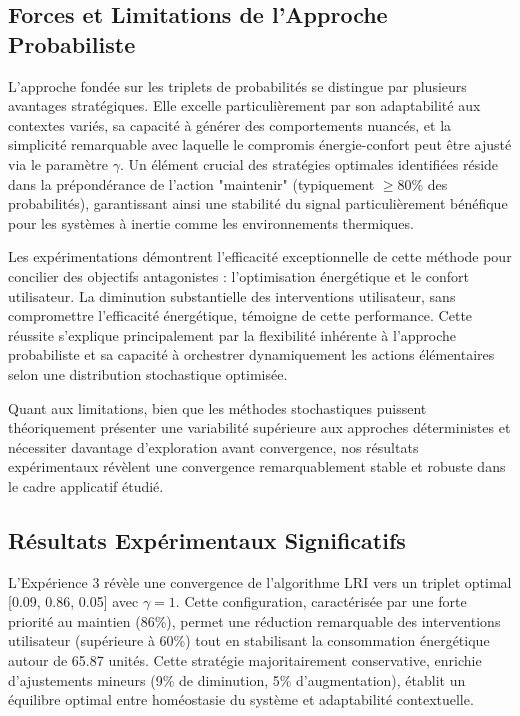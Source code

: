 \documentclass[a4paper,11pt]{article}
\begin{document}
\subsection{Forces et Limitations de l'Approche Probabiliste}

L'approche fondée sur les triplets de probabilités se distingue par plusieurs avantages stratégiques. Elle excelle particulièrement par son adaptabilité aux contextes variés, sa capacité à générer des comportements nuancés, et la simplicité remarquable avec laquelle le compromis énergie-confort peut être ajusté via le paramètre $\gamma$. Un élément crucial des stratégies optimales identifiées réside dans la prépondérance de l'action "maintenir" (typiquement $\geq$80\% des probabilités), garantissant ainsi une stabilité du signal particulièrement bénéfique pour les systèmes à inertie comme les environnements thermiques.

Les expérimentations démontrent l'efficacité exceptionnelle de cette méthode pour concilier des objectifs antagonistes : l'optimisation énergétique et le confort utilisateur. La diminution substantielle des interventions utilisateur, sans compromettre l'efficacité énergétique, témoigne de cette performance. Cette réussite s'explique principalement par la flexibilité inhérente à l'approche probabiliste et sa capacité à orchestrer dynamiquement les actions élémentaires selon une distribution stochastique optimisée.

Quant aux limitations, bien que les méthodes stochastiques puissent théoriquement présenter une variabilité supérieure aux approches déterministes et nécessiter davantage d'exploration avant convergence, nos résultats expérimentaux révèlent une convergence remarquablement stable et robuste dans le cadre applicatif étudié.

\subsection{Résultats Expérimentaux Significatifs}

L'Expérience 3 révèle une convergence de l'algorithme LRI vers un triplet optimal [0.09, 0.86, 0.05] avec $\gamma=1$. Cette configuration, caractérisée par une forte priorité au maintien (86\%), permet une réduction remarquable des interventions utilisateur (supérieure à 60\%) tout en stabilisant la consommation énergétique autour de 65.87 unités. Cette stratégie majoritairement conservative, enrichie d'ajustements mineurs (9\% de diminution, 5\% d'augmentation), établit un équilibre optimal entre homéostasie du système et adaptabilité contextuelle.
\end{document}
